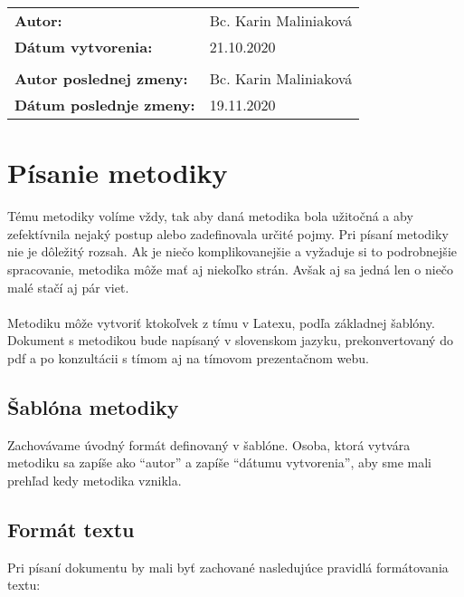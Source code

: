 \documentclass{article}
\begin{document}
    

    \begin{table}[h]
        \begin{tabular}{ll}
            \textbf{Autor:} & Bc. Karin Maliniaková \\
            \textbf{Dátum vytvorenia:} & 21.10.2020 \\
            \\
            \textbf{Autor poslednej zmeny:} & Bc. Karin Maliniaková \\
            \textbf{Dátum poslednje zmeny:} & 19.11.2020 \\
            \hline
        \end{tabular}
        \label{tab:grades}
    \end{table}

    \section*{Písanie metodiky}

        \textnormal{%
        Tému metodiky volíme vždy, tak aby daná metodika bola užitočná a aby zefektívnila nejaký postup alebo zadefinovala určité pojmy. Pri písaní metodiky nie je dôležitý rozsah. Ak je niečo komplikovanejšie a vyžaduje si to podrobnejšie spracovanie, metodika môže mať aj niekoľko strán. Avšak aj sa jedná len o niečo malé stačí aj pár viet. \\\\
        Metodiku môže vytvoriť ktokoľvek z tímu v Latexu, podľa základnej šablóny. Dokument s metodikou bude napísaný v slovenskom jazyku, prekonvertovaný do pdf a po konzultácii s tímom aj na tímovom prezentačnom webu. 
        }

        \subsection*{Šablóna metodiky}

            \textnormal{Zachovávame úvodný formát definovaný v šablóne. Osoba, ktorá vytvára metodiku sa zapíše ako “autor” a zapíše “dátumu vytvorenia”, aby sme mali prehľad kedy metodika vznikla.}

        \subsection*{Formát textu}

            \textnormal{Pri písaní dokumentu by mali byť zachované nasledujúce pravidlá formátovania textu:}
\end{document}
